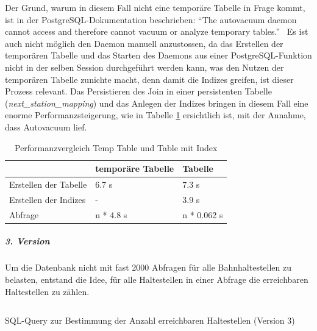 Der Grund, warum in diesem Fall nicht eine temporäre Tabelle in Frage kommt, ist in der PostgreSQL-Dokumentation beschrieben: "`The autovacuum daemon cannot access and therefore cannot vacuum or analyze temporary tables."'~\cite{postgresql_doc}
Es ist auch nicht möglich den Daemon manuell anzustossen, da das Erstellen der temporären Tabelle und das Starten des Daemons aus einer PostgreSQL-Funktion nicht in der selben Session durchgeführt werden kann, was den Nutzen der temporären Tabelle zunichte macht, denn damit die Indizes greifen, ist dieser Prozess relevant.
Das Persistieren des Join in einer persistenten Tabelle (\emph{next\_station\_mapping}) und das Anlegen der Indizes bringen in diesem Fall eine enorme Performanzsteigerung, wie in Tabelle \ref{table:Performanzvergleich Temp Table und Table mit Index} ersichtlich ist, mit der Annahme, dass Autovacuum lief.

\begin{table}[ht]
    \centering
    \begin{tabular}[ht]{l l l}
        \toprule
        \textbf{} 
                                & \textbf{temporäre Tabelle}
                                & \textbf{Tabelle}\\
        \midrule
        Erstellen der Tabelle
                                & 6.7 s
                                & 7.3 s\\
        Erstellen der Indizes
                                & -
                                & 3.9 s\\
        Abfrage
                                & n * 4.8 s
                                & n * 0.062 s\\        
        \bottomrule
    \end{tabular}
    \caption{Performanzvergleich Temp Table und Table mit Index}
    \label{table:Performanzvergleich Temp Table und Table mit Index}
\end{table}

\subparagraph{3. Version}
Um die Datenbank nicht mit fast 2000 Abfragen für alle Bahnhaltestellen zu belasten, entstand die Idee, für alle Haltestellen in einer Abfrage die erreichbaren Haltestellen zu zählen.

\begin{listing}[ht]
    \inputminted{sql}{projectdoc/listing/count_of_distinct_next_stops_v3.sql}
    \caption{SQL-Query zur Bestimmung der Anzahl erreichbaren Haltestellen (Version 3)}
    \label{listing:count_of_distinct_next_stops_v3}
\end{listing}

